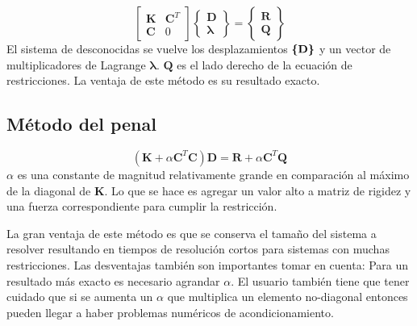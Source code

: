 \begin{equation}
	\begin{bmatrix}
	\mathbf{K} & \mathbf{C}^T\\
	\mathbf{C} & 0
	\end{bmatrix}
	\begin{Bmatrix}
	\mathbf{D} \\
	\pmb{\lambda}
	\end{Bmatrix}
	=
	\begin{Bmatrix}
	\mathbf{R} \\
	\mathbf{Q}
	\end{Bmatrix}
\end{equation}
El sistema de desconocidas se vuelve los desplazamientos $\boldsymbol{\{ }\mathbf{D} \boldsymbol{\}}$ y un vector de multiplicadores de Lagrange $\pmb{\lambda} $. $\mathbf{Q}$ es el lado derecho de la ecuación de restricciones. La ventaja de este método es su resultado exacto.

\subsection*{Método del penal}
\begin{equation}
	(\mathbf{K}+\alpha \mathbf{C}^T \mathbf{C})\mathbf{D} = \mathbf{R} + \alpha \mathbf{C}^T \mathbf{Q}
\end{equation}
$\alpha$ es una constante de magnitud relativamente grande en comparación al máximo de la diagonal de $\mathbf{K}$. Lo que se hace es agregar un valor alto a matriz de rigidez y una fuerza correspondiente para cumplir la restricción. 

La gran ventaja de este método es que se conserva el tamaño del sistema a resolver resultando en tiempos de resolución cortos para sistemas con muchas restricciones. Las desventajas también son importantes tomar en cuenta: Para un resultado más exacto es necesario agrandar $\alpha$. El usuario también tiene que tener cuidado que si se aumenta un $\alpha$ que multiplica un elemento no-diagonal entonces pueden llegar a haber problemas numéricos de acondicionamiento. 

